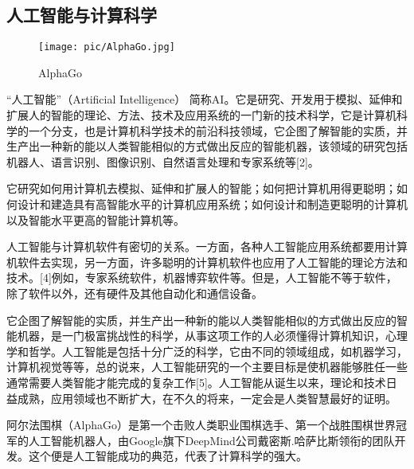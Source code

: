 \documentclass{article}
\begin{document}
\subsection{人工智能与计算科学}

\begin{figure}[!h]
	\begin{center}
		\texttt{[image: pic/AlphaGo.jpg]}
		\caption{AlphaGo}
		\label{fig:AlphaGo}
	\end{center}
\end{figure}

\par “人工智能”（Artificial Intelligence） 简称AI。它是研究、开发用于模拟、延伸和扩展人的智能的理论、方法、技术及应用系统的一门新的技术科学，它是计算机科学的一个分支，也是计算机科学技术的前沿科技领域，它企图了解智能的实质，并生产出一种新的能以人类智能相似的方式做出反应的智能机器，该领域的研究包括机器人、语言识别、图像识别、自然语言处理和专家系统等[2]。\par 
它研究如何用计算机去模拟、延伸和扩展人的智能；如何把计算机用得更聪明；如何设计和建造具有高智能水平的计算机应用系统；如何设计和制造更聪明的计算机以及智能水平更高的智能计算机等。\par
人工智能与计算机软件有密切的关系。一方面，各种人工智能应用系统都要用计算机软件去实现，另一方面，许多聪明的计算机软件也应用了人工智能的理论方法和技术。[4]例如，专家系统软件，机器博弈软件等。但是，人工智能不等于软件，除了软件以外，还有硬件及其他自动化和通信设备。\par
它企图了解智能的实质，并生产出一种新的能以人类智能相似的方式做出反应的智能机器，是一门极富挑战性的科学，从事这项工作的人必须懂得计算机知识，心理学和哲学。人工智能是包括十分广泛的科学，它由不同的领域组成，如机器学习，计算机视觉等等，总的说来，人工智能研究的一个主要目标是使机器能够胜任一些通常需要人类智能才能完成的复杂工作[5]。人工智能从诞生以来，理论和技术日益成熟，应用领域也不断扩大，在不久的将来，一定会是人类智慧最好的证明。\par
阿尔法围棋（AlphaGo）是第一个击败人类职业围棋选手、第一个战胜围棋世界冠军的人工智能机器人，由Google旗下DeepMind公司戴密斯.哈萨比斯领衔的团队开发。这个便是人工智能成功的典范，代表了计算科学的强大。
\end{document}
